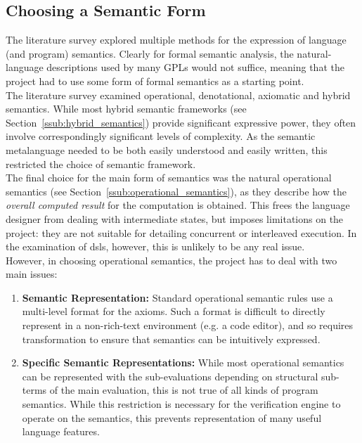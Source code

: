 
\subsection{Choosing a Semantic Form} %
\label{sub:choosing_a_semantic_form}
The literature survey explored multiple methods for the expression of language (and program) semantics.
Clearly for formal semantic analysis, the natural-language descriptions used by many GPLs would not suffice, meaning that the project had to use some form of formal semantics as a starting point. \\

The literature survey examined operational, denotational, axiomatic and hybrid semantics.
While most hybrid semantic frameworks (see Section~\ref{ssub:hybrid_semantics}) provide significant expressive power, they often involve correspondingly significant levels of complexity.
As the semantic metalanguage needed to be both easily understood and easily written, this restricted the choice of semantic framework.\\

The final choice for the main form of semantics was the natural operational semantics (see Section~\ref{ssub:operational_semantics}), as they describe how the \textit{overall computed result} for the computation is obtained.
This frees the language designer from dealing with intermediate states, but imposes limitations on the project: they are not suitable for detailing concurrent or interleaved execution.
In the examination of \glspl{dsl}, however, this is unlikely to be any real issue.\\

However, in choosing operational semantics, the project has to deal with two main issues:
\begin{enumerate}
    \item \textbf{Semantic Representation:} Standard operational semantic rules use a multi-level format for the axioms.
    Such a format is difficult to directly represent in a non-rich-text environment (e.g. a code editor), and so requires transformation to ensure that semantics can be intuitively expressed.
    \item \textbf{Specific Semantic Representations:} While most operational semantics can be represented with the sub-evaluations depending on structural sub-terms of the main evaluation, this is not true of all kinds
    of program semantics.
    While this restriction is necessary for the verification engine to operate on the semantics, this prevents representation of many useful language features.
\end{enumerate}

